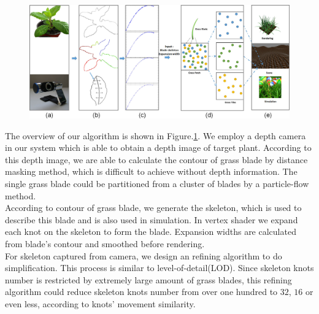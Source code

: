 \documentclass[10pt,journal,compsoc]{IEEEtran}
\begin{document}
\begin{figure}
    \centering
    \includegraphics[width=1.0\textwidth]{figs/algorithm.jpg}
    \label{fig:overview}
\end{figure}

The overview of our algorithm is shown in Figure.\ref{fig:overview}. We employ a depth camera in our system which is able to obtain a depth image of target plant. According to this depth image, we are able to calculate the contour of grass blade by distance masking method, which is difficult to achieve without depth information. The single grass blade could be partitioned from a cluster of blades by a particle-flow method\cite{neubert2007approximate}.\\

According to contour of grass blade, we generate the skeleton, which is used to describe this blade and is also used in simulation. In vertex shader we expand each knot on the skeleton to form the blade. Expansion widths are calculated from blade's contour and smoothed before rendering.\\

For skeleton captured from camera, we design an refining algorithm to do simplification. This process is similar to level-of-detail(LOD). Since skeleton knots number is restricted by extremely large amount of grass blades, this refining algorithm could reduce skeleton knots number from over one hundred to $32$, $16$ or even less, according to knots' movement similarity.\\
\end{document}
